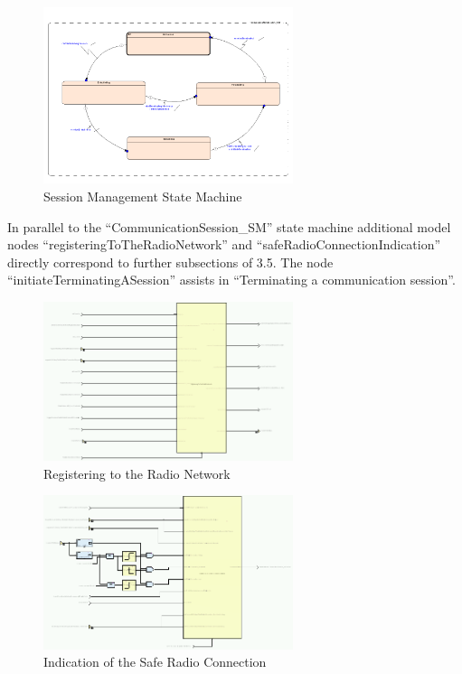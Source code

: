 \documentclass{template/openetcs_article}
\begin{document}
\begin{figure}[htbp]
	\centering
		\includegraphics[width=0.65\textwidth]{CommunicationSessionSM.png}
	\caption{Session Management State Machine}
	\label{fig:CommunicationSessionSM}
\end{figure}

In parallel to the "`CommunicationSession\_SM"' state machine additional model nodes "`registeringToTheRadioNetwork"' and  "`safeRadioConnectionIndication"' directly correspond to further subsections of 3.5. The node "`initiateTerminatingASession"' assists in "`Terminating a communication session"'.


\begin{figure}[h]
	\centering
		\includegraphics[width=0.65\textwidth]{networkRegistration.png}
	\caption{Registering to the Radio Network}
	\label{fig:networkRegistration}
\end{figure}

\begin{figure}[htbp]
	\centering
		\includegraphics[width=0.65\textwidth]{safeRadioConnectionIndication.png}
	\caption{Indication of the Safe Radio  Connection}
	\label{fig:safeRadioConnectionIndication}
\end{figure}
\end{document}
